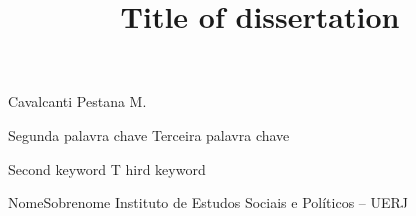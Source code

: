 \documentclass{repUERJ}
\begin{document}

      {Cavalcanti Pestana}
      {M.}


               {Segunda palavra chave}
               {Terceira palavra chave}
               {}

\title{Title of dissertation}
         {Second keyword}
         {T hird keyword}
         {}

           {Nome}{Sobrenome} 
           {Instituto de Estudos Sociais e Políticos -- UERJ}  %








\end{document}
